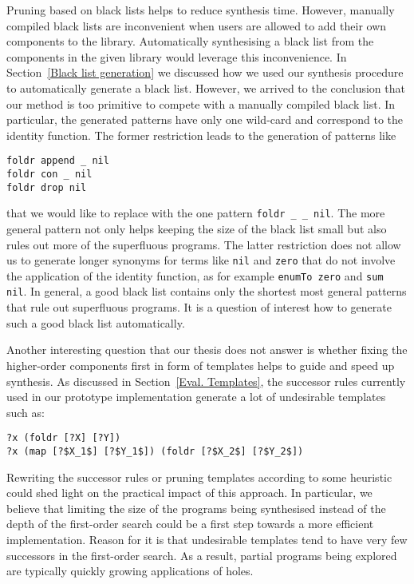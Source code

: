 Pruning based on black lists helps to reduce synthesis time. However, manually compiled black lists are inconvenient when users are allowed to add their own components to the library. Automatically synthesising a black list from the components in the given library would leverage this inconvenience. In Section~\ref{Black list generation} we discussed how we used our synthesis procedure to automatically generate a black list. However, we arrived to the conclusion that our method is too primitive to compete with a manually compiled black list. In particular, the generated patterns have only one wild-card and correspond to the identity function. The former restriction leads to the generation of patterns like
\begin{lstlisting}[style=plain]
foldr append _ nil
foldr con _ nil
foldr drop nil
\end{lstlisting}
that we would like to replace with the one pattern \lstinline!foldr _ _ nil!. The more general pattern not only helps keeping the size of the black list small but also rules out more of the superfluous programs.
The latter restriction does not allow us to generate longer synonyms for terms like \lstinline!nil! and \lstinline!zero! that do not involve the application of the identity function, as for example \lstinline!enumTo zero! and \lstinline!sum nil!.
In general, a good black list contains only the shortest most general patterns that rule out superfluous programs. It is a question of interest how to generate such a good black list automatically.

Another interesting question that our thesis does not answer is whether fixing the higher-order components first in form of templates helps to guide and speed up synthesis. As discussed in Section~\ref{Eval. Templates}, the successor rules currently used in our prototype implementation generate a lot of undesirable templates such as:
\begin{lstlisting}[style=plain]
?x (foldr [?X] [?Y])
?x (map [?$X_1$] [?$Y_1$]) (foldr [?$X_2$] [?$Y_2$])
\end{lstlisting}
Rewriting the successor rules or pruning templates according to some heuristic could shed light on the practical impact of this approach. In particular, we believe that limiting the size of the programs being synthesised instead of the depth of the first-order search could be a first step towards a more efficient implementation. Reason for it is that undesirable templates tend to have very few successors in the first-order search. As a result, partial programs being explored are typically quickly growing applications of holes.

